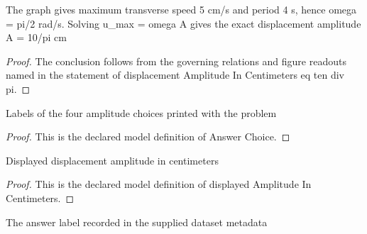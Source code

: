 \begin{lemma}
  \label{lem:physics:phyx-mini-0305:phyxminiproblems-problemphyxmini0305-displacementamplitudeincentimeters-eq-ten-div-pi}
  The graph gives maximum transverse speed 5 cm/s and period 4 s, hence omega = pi/2 rad/s. Solving u\_max = omega A gives the exact displacement amplitude A = 10/pi cm
\end{lemma}
\begin{proof}
  The conclusion follows from the governing relations and figure readouts named in the statement of displacement Amplitude In Centimeters eq ten div pi.
\end{proof}
\begin{definition}
  \label{def:physics:phyx-mini-0305:phyxminiproblems-problemphyxmini0305-answerchoice}
  Labels of the four amplitude choices printed with the problem
\end{definition}
\begin{proof}
  This is the declared model definition of Answer Choice.
\end{proof}
\begin{definition}
  \label{def:physics:phyx-mini-0305:phyxminiproblems-problemphyxmini0305-displayedamplitudeincentimeters}
  Displayed displacement amplitude in centimeters
\end{definition}
\begin{proof}
  This is the declared model definition of displayed Amplitude In Centimeters.
\end{proof}
\begin{definition}
  \label{def:physics:phyx-mini-0305:phyxminiproblems-problemphyxmini0305-recordeddatasetanswer}
  The answer label recorded in the supplied dataset metadata
\end{definition}
